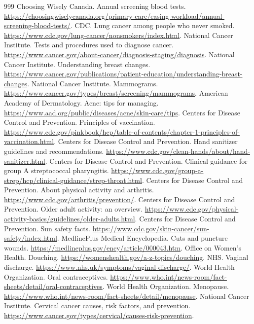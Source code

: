 \documentclass[11pt,oneside]{book}
\begin{document}
\begin{thebibliography}{999}
Choosing Wisely Canada. Annual screening blood tests. \url{https://choosingwiselycanada.org/primary-care/easing-workload/annual-screening-blood-tests/}.
CDC. Lung cancer among people who never smoked. \url{https://www.cdc.gov/lung-cancer/nonsmokers/index.html}.
National Cancer Institute. Tests and procedures used to diagnose cancer. \url{https://www.cancer.gov/about-cancer/diagnosis-staging/diagnosis}.
National Cancer Institute. Understanding breast changes. \url{https://www.cancer.gov/publications/patient-education/understanding-breast-changes}.
National Cancer Institute. Mammograms. \url{https://www.cancer.gov/types/breast/screening/mammograms}.
American Academy of Dermatology. Acne: tips for managing. \url{https://www.aad.org/public/diseases/acne/skin-care/tips}.
Centers for Disease Control and Prevention. Principles of vaccination. \url{https://www.cdc.gov/pinkbook/hcp/table-of-contents/chapter-1-principles-of-vaccination.html}.
Centers for Disease Control and Prevention. Hand sanitizer guidelines and recommendations. \url{https://www.cdc.gov/clean-hands/about/hand-sanitizer.html}.
Centers for Disease Control and Prevention. Clinical guidance for group A streptococcal pharyngitis. \url{https://www.cdc.gov/group-a-strep/hcp/clinical-guidance/strep-throat.html}.
Centers for Disease Control and Prevention. About physical activity and arthritis. \url{https://www.cdc.gov/arthritis/prevention/}.
Centers for Disease Control and Prevention. Older adult activity: an overview. \url{https://www.cdc.gov/physical-activity-basics/guidelines/older-adults.html}.
Centers for Disease Control and Prevention. Sun safety facts. \url{https://www.cdc.gov/skin-cancer/sun-safety/index.html}.
MedlinePlus Medical Encyclopedia. Cuts and puncture wounds. \url{https://medlineplus.gov/ency/article/000043.htm}.
Office on Women's Health. Douching. \url{https://womenshealth.gov/a-z-topics/douching}.
NHS. Vaginal discharge. \url{https://www.nhs.uk/symptoms/vaginal-discharge/}.
World Health Organization. Oral contraceptives. \url{https://www.who.int/news-room/fact-sheets/detail/oral-contraceptives}.
World Health Organization. Menopause. \url{https://www.who.int/news-room/fact-sheets/detail/menopause}.
National Cancer Institute. Cervical cancer causes, risk factors, and prevention. \url{https://www.cancer.gov/types/cervical/causes-risk-prevention}.

\end{thebibliography}
\end{document}
